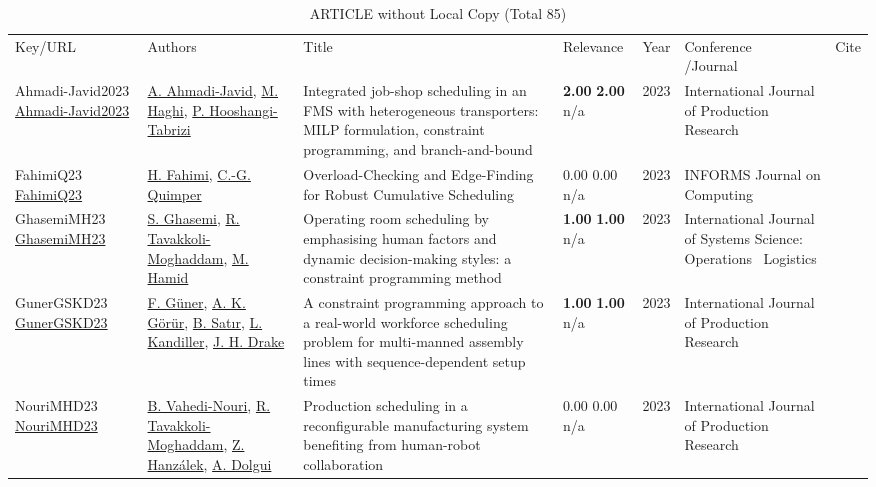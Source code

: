 {\scriptsize
\begin{longtable}{p{3cm}p{5cm}p{10cm}p{1cm}rp{2.5cm}l}
\rowcolor{white}\caption{ARTICLE without Local Copy (Total 85)}\\ \toprule
\rowcolor{white}Key/URL & Authors & Title & Relevance &Year & \shortstack{Conference\\/Journal} & Cite\\ \midrule
\endhead
\bottomrule
\endfoot
Ahmadi-Javid2023 \href{http://dx.doi.org/10.1080/00207543.2023.2230489}{Ahmadi-Javid2023} & \hyperref[auth:a1759]{A. Ahmadi-Javid}, \hyperref[auth:a1760]{M. Haghi}, \hyperref[auth:a1761]{P. Hooshangi-Tabrizi} & Integrated job-shop scheduling in an FMS with heterogeneous transporters: MILP formulation, constraint programming, and branch-and-bound & \noindent{}\textbf{2.00} \textbf{2.00} n/a & 2023 & \cellcolor{red!20}International Journal of Production Research & \cite{Ahmadi-Javid2023}\\
FahimiQ23 \href{http://dx.doi.org/10.1287/ijoc.2021.0138}{FahimiQ23} & \hyperref[auth:a122]{H. Fahimi}, \hyperref[auth:a37]{C.-G. Quimper} & Overload-Checking and Edge-Finding for Robust Cumulative Scheduling & \noindent{}\textcolor{black!50}{0.00} \textcolor{black!50}{0.00} n/a & 2023 & \cellcolor{red!20}INFORMS Journal on Computing & \cite{FahimiQ23}\\
GhasemiMH23 \href{http://dx.doi.org/10.1080/23302674.2023.2224509}{GhasemiMH23} & \hyperref[auth:a980]{S. Ghasemi}, \hyperref[auth:a429]{R. Tavakkoli-Moghaddam}, \hyperref[auth:a981]{M. Hamid} & Operating room scheduling by emphasising human factors and dynamic decision-making styles: a constraint programming method & \noindent{}\textbf{1.00} \textbf{1.00} n/a & 2023 & \cellcolor{red!20}International Journal of Systems Science: Operations \  Logistics & \cite{GhasemiMH23}\\
GunerGSKD23 \href{http://dx.doi.org/10.1080/00207543.2023.2226772}{GunerGSKD23} & \hyperref[auth:a1425]{F. G\"{u}ner}, \hyperref[auth:a1426]{A. K. G\"{o}r\"{u}r}, \hyperref[auth:a1427]{B. Satır}, \hyperref[auth:a1428]{L. Kandiller}, \hyperref[auth:a1429]{J. H. Drake} & A constraint programming approach to a real-world workforce scheduling problem for multi-manned assembly lines with sequence-dependent setup times & \noindent{}\textbf{1.00} \textbf{1.00} n/a & 2023 & \cellcolor{red!20}International Journal of Production Research & \cite{GunerGSKD23}\\
NouriMHD23 \href{http://dx.doi.org/10.1080/00207543.2023.2173503}{NouriMHD23} & \hyperref[auth:a736]{B. Vahedi-Nouri}, \hyperref[auth:a429]{R. Tavakkoli-Moghaddam}, \hyperref[auth:a945]{Z. Hanzálek}, \hyperref[auth:a946]{A. Dolgui} & Production scheduling in a reconfigurable manufacturing system benefiting from human-robot collaboration & \noindent{}\textcolor{black!50}{0.00} \textcolor{black!50}{0.00} n/a & 2023 & \cellcolor{red!20}International Journal of Production Research & \cite{NouriMHD23}\\

\end{longtable}}
